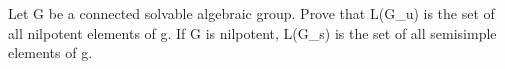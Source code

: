 Let G be a connected solvable algebraic group. Prove that L(G_u) is the set of all nilpotent elements of g. If G is nilpotent, L(G_s) is the set of all semisimple elements of g.
